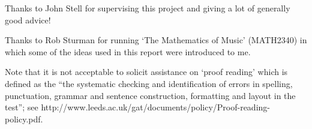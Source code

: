 Thanks to John Stell for supervising this project and giving a lot of generally
good advice!

Thanks to Rob Sturman for running `The Mathematics of Music' (MATH2340) in which
some of the ideas used in this report were introduced to me.

\vspace{1cm}

Note that it is not acceptable to solicit assistance on `proof reading' which is
defined as the ``the systematic checking and identification of errors in
spelling, punctuation, grammar and sentence construction, formatting and layout
in the test''; see http://www.leeds.ac.uk/gat/documents/policy/Proof-reading-policy.pdf.

